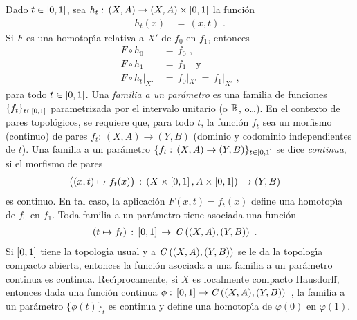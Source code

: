 Dado $t\in\left[0,1\right]$, sea $h_{t}:\,(X,A)\rightarrow (X,A)\times\left[0,1\right]$ la
funci\'{o}n
\begin{align*}
	h_{t}(x) & \,=\,(x,t)
	\text{ .}
\end{align*}
%
Si $F$ es una homotop\'{\i}a relativa a $X'$ de $f_{0}$ en $f_{1}$, entonces
\begin{align*}
	F\circ h_{0} & \,=\,f_{0} \text{ ,} \\
	F\circ h_{1} & \,=\,f_{1} \quad\text{y} \\
	F\circ h_{t}|_{X'} & \,=\,f_{0}|_{X'} \,=\,f_{1}|_{X'}
	\text{ ,}
\end{align*}
%
para todo $t\in\left[0,1\right]$. Una \emph{familia a un par\'{a}metro} es una
familia de funciones $\{f_{t}\}_{t\in\left[0,1\right]}$ parametrizada por el
intervalo unitario (o $\mathbb{R}$, o\dots). En el contexto de pares
topol\'{o}gicos, se requiere que, para todo $t$, la funci\'{o}n $f_{t}$
sea un morfismo (continuo) de pares $f_{t}:\,(X,A)\rightarrow (Y,B)$ (dominio
y codominio independientes de $t$). Una familia a un par\'{a}metro
$\{f_{t}:\,(X,A)\rightarrow (Y,B)\}_{t\in\left[0,1\right]}$ se dice \emph{continua},
si el morfismo de pares
\begin{align*}
	\big((x,t)\mapsto f_{t}(x)\big) & \,:\,
		(X\times\left[0,1\right],A\times\left[0,1\right])\,\rightarrow (Y,B)
\end{align*}
%
es continuo. En tal caso, la aplicaci\'{o}n $F(x,t)=f_{t}(x)$ define una
homotop\'{\i}a de $f_{0}$ en $f_{1}$. Toda familia a un par\'{a}metro
tiene asociada una funci\'{o}n
\begin{align*}
	(t\mapsto f_{t}) & \,:\,\left[0,1\right]\,\rightarrow\,
		\mathit{C}\left((X,A),(Y,B)\right)
	\text{ .}
\end{align*}
%
Si $\left[0,1\right]$ tiene la topolog\'{\i}a usual y a $\mathit{C}\left((X,A),(Y,B)\right)$
se le da la topolog\'{\i}a compacto abierta, entonces la funci\'{o}n
asociada a una familia a un par\'{a}metro continua es continua.
Rec\'{\i}procamente, si $X$ es localmente compacto Hausdorff, entonces
dada una funci\'{o}n continua
\begin{math}
	\phi:\,\left[0,1\right]\rightarrow\mathit{C}\left((X,A),(Y,B)\right)
\end{math}~,
la familia a un par\'{a}metro $\{\phi(t)\}_{t}$ es continua y define una
homotop\'{\i}a de $\varphi(0)$ en $\varphi(1)$.

